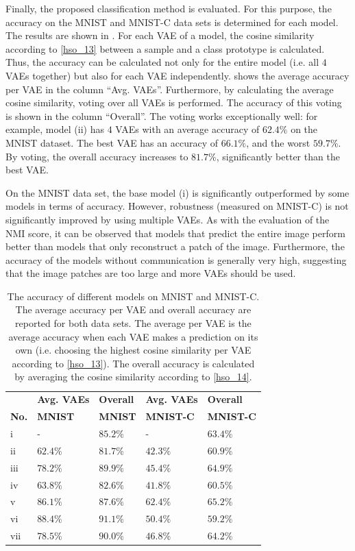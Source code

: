 Finally, the proposed classification method is evaluated. For this purpose, the accuracy on the MNIST and MNIST-C data sets is determined for each model. The results are shown in .
For each VAE of a model, the cosine similarity according to \eqref{hso_13} between a sample and a class prototype is calculated. Thus, the accuracy can be calculated not only for the entire model (i.e. all $4$ VAEs together) but also for each VAE independently.  shows the average accuracy per VAE in the column ``Avg. VAEs''. Furthermore, by calculating the average cosine similarity, voting over all VAEs is performed. The accuracy of this voting is shown in the column ``Overall''. The voting works exceptionally well: for example, model (ii) has $4$ VAEs with an average accuracy of $62.4\%$ on the MNIST dataset. The best VAE has an accuracy of $66.1\%$, and the worst $59.7\%$. By voting, the overall accuracy increases to $81.7\%$, significantly better than the best VAE.

On the MNIST data set, the base model (i) is significantly outperformed by some models in terms of accuracy. However, robustness (measured on MNIST-C) is not significantly improved by using multiple VAEs. As with the evaluation of the NMI score, it can be observed that models that predict the entire image perform better than models that only reconstruct a patch of the image. Furthermore, the accuracy of the models without communication is generally very high, suggesting that the image patches are too large and more VAEs should be used.



\begin{table}[h] 
    \centering
	 \begin{tabular}{l l l l l}
	 	& \textbf{Avg. VAEs} & \textbf{Overall} & \textbf{Avg. VAEs} & \textbf{Overall}\\
    	\textbf{No.} & \textbf{MNIST} & \textbf{MNIST} & \textbf{MNIST-C} & \textbf{MNIST-C}\\
        \hline
		i & - & $85.2\%$ & - & $63.4\%$ \\
		ii & $62.4\%$ & $81.7\%$ & $42.3\%$ & $60.9\%$ \\
		iii & $78.2\%$ & $89.9\%$ & $45.4\%$ & $64.9\%$ \\
		iv & $63.8\%$ & $82.6\%$ & $41.8\%$ & $60.5\%$  \\
		v & $86.1\%$ & $87.6\%$ & $62.4\%$ & $65.2\%$ \\
		vi & $88.4\%$ & $91.1\%$ & $50.4\%$ & $59.2\%$ \\
		vii & $78.5\%$ & $90.0\%$ & $46.8\%$ & $64.2\%$ \\
    \end{tabular}
    \caption[Accuracy of different architectures on MNIST and MNIST-C]{The accuracy of different models on MNIST and MNIST-C. The average accuracy per VAE and overall accuracy are reported for both data sets. The average per VAE is the average accuracy when each VAE makes a prediction on its own (i.e. choosing the highest cosine similarity per VAE according to \eqref{hso_13}). The overall accuracy is calculated by averaging the cosine similarity according to \eqref{hso_14}.}
\end{table}

